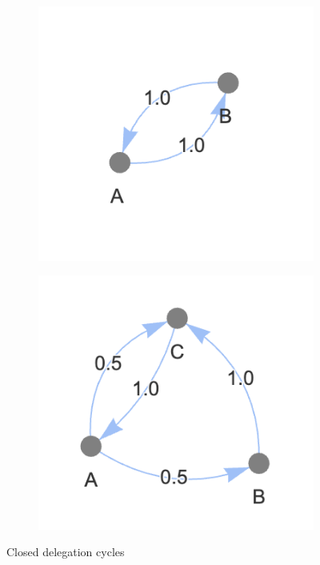 \begin{figure}[h]
\begin{subfigure}[t]{0.32\textwidth}
        \includegraphics[width=\textwidth]{invalid_graph_2}
    \end{subfigure}
    \hfill
    \begin{subfigure}[t]{0.32\textwidth}
        \centering
        \includegraphics[width=\textwidth]{invalid_graph_3}
    \end{subfigure}
    \caption{Closed delegation cycles}
    \label{fig:closed-delegation-cycles}
\end{figure}

